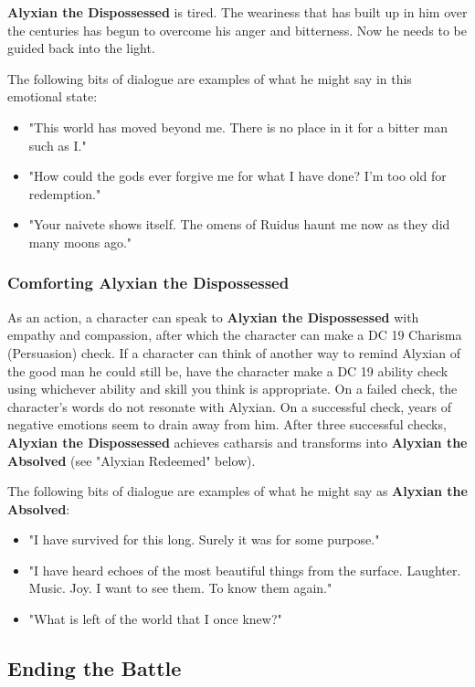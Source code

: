 \documentclass[a4paper, 11pt, bg=full, twocolumn, nooutline]{dndbook}
\begin{document}
\textbf{Alyxian the Dispossessed} is tired. The weariness that has built up in him over the centuries has begun to overcome his anger and bitterness. Now he needs to be guided back into the light.

The following bits of dialogue are examples of what he might say in this emotional state:

\begin{itemize}
\item "This world has moved beyond me. There is no place in it for a bitter man such as I."
\item "How could the gods ever forgive me for what I have done? I'm too old for redemption."
\item "Your naivete shows itself. The omens of Ruidus haunt me now as they did many moons ago."
\end{itemize}

\subsubsection{Comforting Alyxian the Dispossessed}

As an action, a character can speak to \textbf{Alyxian the Dispossessed} with empathy and compassion, after which the character can make a DC 19 Charisma (Persuasion) check. If a character can think of another way to remind Alyxian of the good man he could still be, have the character make a DC 19 ability check using whichever ability and skill you think is appropriate. On a failed check, the character's words do not resonate with Alyxian. On a successful check, years of negative emotions seem to drain away from him. After three successful checks, \textbf{Alyxian the Dispossessed} achieves catharsis and transforms into \textbf{Alyxian the Absolved} (see "Alyxian Redeemed" below).

The following bits of dialogue are examples of what he might say as \textbf{Alyxian the Absolved}:

\begin{itemize}
\item "I have survived for this long. Surely it was for some purpose."
\item "I have heard echoes of the most beautiful things from the surface. Laughter. Music. Joy. I want to see them. To know them again."
\item "What is left of the world that I once knew?"
\end{itemize}

\subsection{Ending the Battle}
\end{document}
